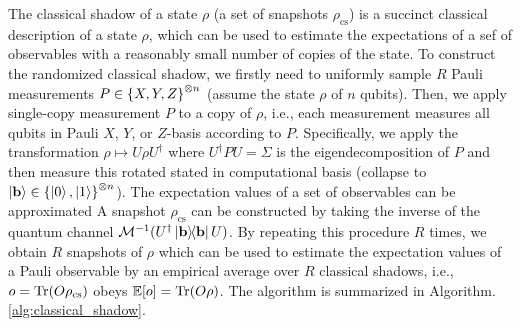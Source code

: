 \documentclass[
aps,
pra,
twocolumn,
floatfix,
]{revtex4-2}
\theoremstyle{plain}
\theoremstyle{definition}
\newcommand{\dm}{\rho}
\newcommand{\cs}{\text{cs}}
\newcommand{\U}{U}
\begin{document}
The classical shadow of a state $\dm$ (a set of snapshots $\dm_{\cs}$) is a succinct classical description of a state $\dm$, which can be used to estimate the expectations of a sef of observables with a reasonably small number of copies of the state.
To construct the randomized classical shadow, we firstly need to uniformly sample $R$ Pauli measurements $P\in\qty{X,Y,Z}^{\otimes n}$ (assume the state $\dm$ of $n$ qubits).
Then, we apply single-copy measurement $P$ to a copy of $\dm$, i.e., each measurement measures all qubits in Pauli $X$, $Y$, or $Z$-basis according to $P$.
Specifically, we apply the transformation $\dm \mapsto \U \dm \U^\dagger$ where $U^\dagger P U = \Sigma$ is the eigendecomposition of $P$ and then measure this rotated stated in computational basis (collapse to $\ket{\vb{b}}\in\qty{\ket{0},\ket{1}}^{\otimes n}$).
The expectation values of a set of observables can be approximated 
A snapshot $\dm_{\cs}$ can be constructed by taking the inverse of the quantum channel $\mathcal{M}^{-1}(U^\dagger\op{\vb{b}}U)$.
By repeating this procedure $R$ times, we obtain $R$ snapshots of $\dm$ which can be used to estimate the expectation values of a Pauli observable by an empirical average over $R$ classical shadows, 
i.e., $o = \Tr(O \dm_{\cs})$ obeys $\expectation[o] =\Tr(O \dm)$.
The algorithm is summarized in Algorithm. \ref{alg:classical_shadow}.
\end{document}
